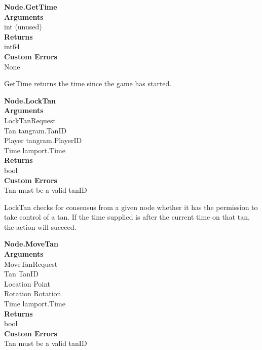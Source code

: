 \documentclass[twocolumn]{article}
\begin{document}
\begin{flushleft}
\textbf{{\large Node.GetTime}}\\
\textbf{Arguments}\\
\hspace*{1em}int (unused)\\
\textbf{Returns}\\
\hspace*{1em}int64\\
\textbf{Custom Errors}\\
\hspace*{1em}None
\end{flushleft}

GetTime returns the time since the game has started.

\begin{flushleft}
\textbf{{\large Node.LockTan}}\\
\textbf{Arguments}\\
\hspace*{1em}LockTanRequest\\
\hspace*{2em}Tan tangram.TanID\\
\hspace*{2em}Player tangram.PlayerID\\
\hspace*{2em}Time lamport.Time\\
\textbf{Returns}\\
\hspace*{1em}bool\\
\textbf{Custom Errors}\\
\hspace*{1em}Tan must be a valid tanID
\end{flushleft}

LockTan checks for consensus from a given node whether it has the permission to take control of a tan. If the time supplied is after the current time on that tan, the action will succeed.

\begin{flushleft}
\textbf{{\large Node.MoveTan}}\\
\textbf{Arguments}\\
\hspace*{1em}MoveTanRequest\\
\hspace*{2em}Tan TanID\\
\hspace*{2em}Location Point\\
\hspace*{2em}Rotation Rotation\\
\hspace*{2em}Time lamport.Time\\
\textbf{Returns}\\
\hspace*{1em}bool\\
\textbf{Custom Errors}\\
\hspace*{1em}Tan must be a valid tanID
\end{flushleft}
\end{document}
